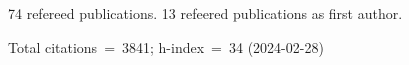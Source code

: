 74 refereed publications. 13 refeered publications as first author.

Total citations~=~3841; h-index~=~34 (2024-02-28)